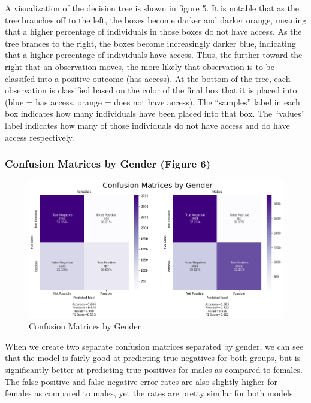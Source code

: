 \documentclass[water,article,submit,moreauthors,pdftex]{mdpi}
\begin{document}
A visualization of the decision tree is shown in figure 5. It is notable
that as the tree branches off to the left, the boxes become darker and
darker orange, meaning that a higher percentage of individuals in those
boxes do not have access. As the tree brances to the right, the boxes
become increasingly darker blue, indicating that a higher percentage of
individuals have access. Thus, the further toward the right that an
observation moves, the more likely that observation is to be classifed
into a positive outcome (has access). At the bottom of the tree, each
observation is classified based on the color of the final box that it is
placed into (blue = has access, orange = does not have access). The
``samples'' label in each box indicates how many individuals have been
placed into that box. The ``values'' label indicates how many of those
individuals do not have access and do have access respectively.

\hypertarget{confusion-matrices-by-gender-figure-6}{%
\subsubsection{Confusion Matrices by Gender (Figure
6)}\label{confusion-matrices-by-gender-figure-6}}

\begin{figure}
\centering
\includegraphics[width=\textwidth,height=0.5\textheight]{images/confusionMatrices.png}
\caption{Confusion Matrices by Gender}
\end{figure}

When we create two separate confusion matrices separated by gender, we
can see that the model is fairly good at predicting true negatives for
both groups, but is significantly better at predicting true positives
for males as compared to females. The false positive and false negative
error rates are also slightly higher for females as compared to males,
yet the rates are pretty similar for both models.
\end{document}
